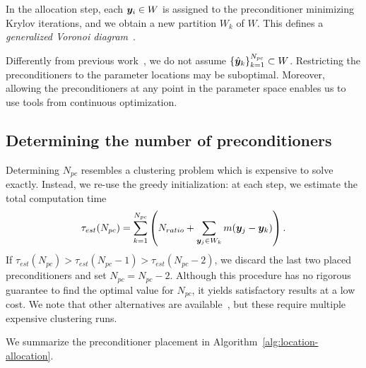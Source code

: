 In the allocation step, each ${\bm{y}}_i \in W$ is assigned to the preconditioner minimizing Krylov iterations, and we obtain a new partition $W_k$ of $W$.
This defines a \emph{generalized Voronoi diagram}~\cite{chew1985}.

\begin{remark}\label{rem:pcnotatcol}
Differently from previous work~\cite{graham2021}, we do not assume $\{\hat{{\bm{y}}}_k\}_{k=1}^{N_{pc}} \subset W$.
Restricting the preconditioners to the parameter locations may be suboptimal.
Moreover, allowing the preconditioners at any point in the parameter space enables us to use tools from continuous optimization.
\end{remark}

\subsection{Determining the number of preconditioners}\label{subsec:determining-Npc}
Determining $N_{pc}$ resembles a clustering problem which is expensive to solve exactly.
Instead, we re-use the greedy initialization: at each step, we estimate the total computation time
\begin{align*}
    \tau_{est}(N_{pc})=\sum_{k=1}^{N_{pc}}\left(N_{ratio}+  \sum_{{\bm{y}}_j\in W_k} m({\bm{y}}_j - {\bm{y}}_k)\right).
\end{align*}
If $\tau_{est}(N_{pc}) > \tau_{est}(N_{pc} - 1) > \tau_{est}(N_{pc} - 2)$, we discard the last two placed preconditioners and set $N_{pc} = N_{pc} - 2$.
Although this procedure has no rigorous guarantee to find the optimal value for $N_{pc}$, it yields satisfactory results at a low cost.
We note that other alternatives are available~\cite{thorndike1953,rousseeuw1987,tibshirani2001}, but these require multiple expensive clustering runs.

We summarize the preconditioner placement in Algorithm~\ref{alg:location-allocation}.


